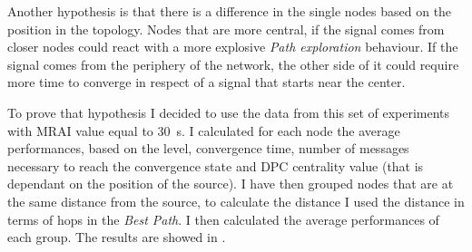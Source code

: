 Another hypothesis is that there is a difference in the single nodes based
on the position in the topology.
Nodes that are more central, if the signal comes from closer nodes could
react with a more explosive \textit{Path exploration} behaviour.
If the signal comes from the periphery of the network, the other side of
it could require more time to converge in respect of a signal that starts
near the center.

To prove that hypothesis I decided to use the data from this set of experiments
with \ac{MRAI} value equal to \SI{30}{\second}.
I calculated for each node the average performances, based on the level, convergence
time, number of messages necessary to reach the convergence state and \ac{DPC}
centrality value (that is dependant on the position of the source).
I have then grouped nodes that are at the same distance from the source, to
calculate the distance I used the distance in terms of hops in the \textit{Best
Path}.
I then calculated the average performances of each group.
The results are showed in .

